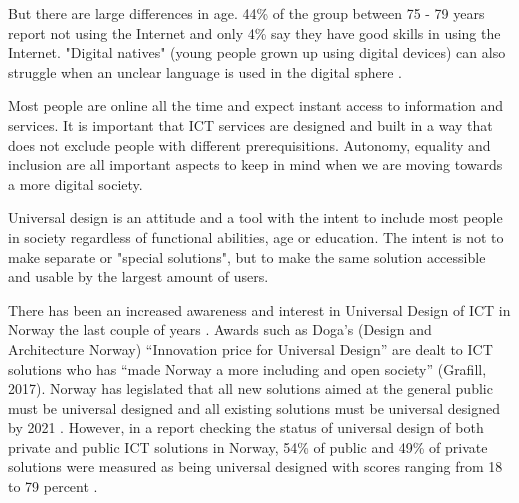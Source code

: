 But there are large differences in age. 44\% of the group between 75 - 79 years report not using the Internet and only 4\% say they have good skills in using the Internet. "Digital natives" (young people grown up using digital devices) can also struggle when an unclear language is used in the digital sphere \parencite[40]{Moderniseringsdepartementet2016}.

Most people are online all the time and expect instant access to information and services. It is important that ICT services are designed and built in a way that does not exclude people with different prerequisitions. Autonomy, equality and inclusion are all important aspects to keep in mind when we are moving towards a more digital society.

Universal design is an attitude and a tool with the intent to include most people in society regardless of functional abilities, age or education. The intent is not to make separate or "special solutions", but to make the same solution accessible and usable by the largest amount of users. 

There has been an increased awareness and interest in Universal Design of ICT in Norway the last couple of years \parencite{begnum_universal_2017}. Awards such as Doga’s (Design and Architecture Norway) “Innovation price for Universal Design” are dealt to ICT solutions who has “made Norway a more including and open society” (Grafill, 2017). Norway has legislated that all new solutions aimed at the general public must be universal designed and all existing solutions must be universal designed by 2021 \parencite{ministry_of_children_and_equality_act_2018}. However, in a report checking the status of universal design of both private and public ICT solutions in Norway, 54\% of public and 49\% of private solutions were measured as being universal designed with scores ranging from 18 to 79 percent \parencite{difi_digitale_2015}.





